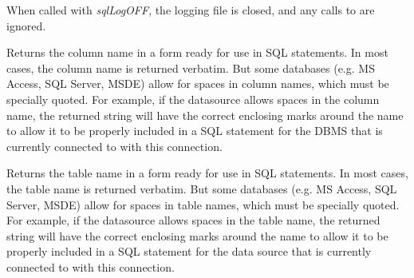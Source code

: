 When called with {\it sqlLogOFF}, the logging file is closed, and any calls to  are ignored.


\label{wxdbsqlcolumnname}


Returns the column name in a form ready for use in SQL statements.  
In most cases, the column name is returned verbatim.  But some databases
(e.g. MS Access, SQL Server, MSDE) allow for spaces in column names, which 
must be specially quoted.  For example, if the datasource allows spaces
in the column name, the returned string will have the correct enclosing 
marks around the name to allow it to be properly included in a SQL statement 
for the DBMS that is currently connected to with this connection.






\label{wxdbsqltablename}


Returns the table name in a form ready for use in SQL statements.  
In most cases, the table name is returned verbatim.  But some databases
(e.g. MS Access, SQL Server, MSDE) allow for spaces in table names, which 
must be specially quoted.  For example, if the datasource allows spaces
in the table name, the returned string will have the correct enclosing 
marks around the name to allow it to be properly included in a SQL statement 
for the data source that is currently connected to with this connection.






